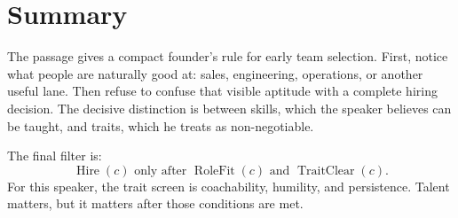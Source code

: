 \section{Summary}

The passage gives a compact founder's rule for early team selection. First, notice what people are naturally good at: sales, engineering, operations, or another useful lane. Then refuse to confuse that visible aptitude with a complete hiring decision. The decisive distinction is between skills, which the speaker believes can be taught, and traits, which he treats as non-negotiable.

The final filter is:
\begin{equation}
  \boxed{
    \operatorname{Hire}(c)
    \text{ only after }
    \operatorname{RoleFit}(c)
    \text{ and }
    \operatorname{TraitClear}(c)
  }.
\end{equation}
For this speaker, the trait screen is coachability, humility, and persistence. Talent matters, but it matters after those conditions are met.
